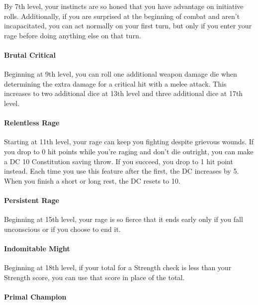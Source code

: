 By 7th level, your instincts are so honed that you have advantage on
initiative rolls. Additionally, if you are surprised at the beginning of
combat and aren't incapacitated, you can act normally on your first
turn, but only if you enter your rage before doing anything else on that
turn.

\paragraph{Brutal Critical}\label{dreadnought-feature-brutal-critical}

Beginning at 9th level, you can roll one additional weapon damage die
when determining the extra damage for a critical hit with a melee
attack. This increases to two additional dice at 13th level and three
additional dice at 17th level.

\paragraph{Relentless Rage}\label{dreadnought-feature-relentless-rage}

Starting at 11th level, your rage can keep you fighting despite grievous
wounds. If you drop to 0 hit points while you're raging and don't die
outright, you can make a DC 10 Constitution saving throw. If you
succeed, you drop to 1 hit point instead. Each time you use this feature
after the first, the DC increases by 5. When you finish a short or long
rest, the DC resets to 10.

\paragraph{Persistent Rage}\label{dreadnought-feature-persistent-rage}

Beginning at 15th level, your rage is so fierce that it ends early only
if you fall unconscious or if you choose to end it.

\paragraph{Indomitable
Might}\label{dreadnought-feature-indomitable-might}

Beginning at 18th level, if your total for a Strength check is less than
your Strength score, you can use that score in place of the total.

\paragraph{Primal Champion}\label{dreadnought-feature-primal-champion}

